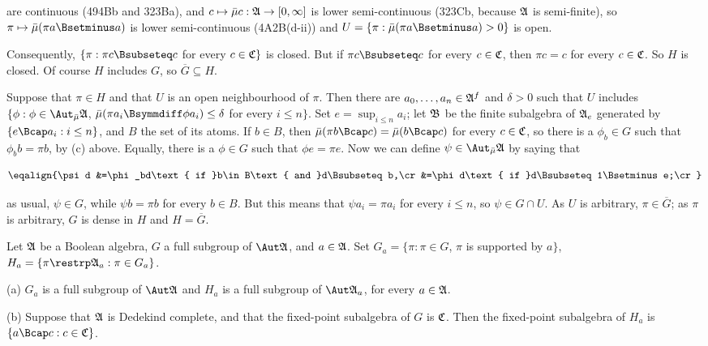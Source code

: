 {\noindent are continuous (494Bb and 323Ba), and
$c\mapsto\bar\mu c:\frak A\to[0,\infty]$ is lower semi-continuous
(323Cb, because $\frak A$ is semi-finite), so
$\pi\mapsto\bar\mu(\pi a\Bsetminus a)$ is lower semi-continuous
(4A2B(d-ii)) and $U=\{\pi:\bar\mu(\pi a\Bsetminus a)>0\}$ is open.\ \Qed

Consequently, $\{\pi:\pi c\Bsubseteq c$ for every $c\in\frak C\}$ is
closed.   But if $\pi c\Bsubseteq c$ for every $c\in\frak C$, then
$\pi c=c$ for every $c\in\frak C$.  So $H$ is closed.   Of course
$H$ includes $G$, so $\overline{G}\subseteq H$.

\medskip

Suppose that $\pi\in H$ and that $U$ is an open neighbourhood of $\pi$.
Then there are $a_0,\ldots,a_n\in\frak A^f$ and
$\delta>0$ such that $U$ includes
$\{\phi:\phi\in\AmuA$, $\bar\mu(\pi a_i\Bsymmdiff\phi a_i)\le\delta$
for every $i\le n\}$.
Set $e=\sup_{i\le n}a_i$;
let $\frak B$ be the finite subalgebra of $\frak A_e$
generated by
$\{e\Bcap a_i:i\le n\}$, and $B$ the set of its
atoms.
If $b\in B$, then
$\bar\mu(\pi b\Bcap c)=\bar\mu(b\Bcap c)$
for every $c\in\frak C$, so there is a $\phi_b\in G$ such that
$\phi_bb=\pi b$, by (c) above.
Equally, there is a $\phi\in G$ such that $\phi e=\pi e$.   Now we can
define $\psi\in\AmuA$ by saying that

$$\eqalign{\psi d
&=\phi_bd\text{ if }b\in B\text{ and }d\Bsubseteq b,\cr
&=\phi d\text{ if }d\Bsubseteq 1\Bsetminus e;\cr}$$

\noindent as usual, $\psi\in G$, while $\psi b=\pi b$ for every $b\in B$.
But this means that $\psi a_i=\pi a_i$ for every $i\le n$, so
$\psi\in G\cap U$.   As $U$ is arbitrary, $\pi\in\overline{G}$;
as $\pi$ is arbitrary, $G$ is dense in $H$ and $H=\overline{G}$.
}%

 Let $\frak A$ be a Boolean algebra, $G$ a
full subgroup of $\Aut\frak A$, and $a\in\frak A$.   Set
$G_a=\{\pi:\pi\in G$, $\pi$ is supported by $a\}$,
$H_a=\{\pi\restrp\frak A_a:\pi\in G_a\}$.

(a) $G_a$ is a full subgroup of $\Aut\frak A$ and
$H_a$ is a full subgroup of $\Aut\frak A_a$, for every $a\in\frak A$.

(b) Suppose that $\frak A$ is Dedekind complete, and that the fixed-point
subalgebra of $G$ is $\frak C$.
Then the fixed-point subalgebra of $H_a$ is $\{a\Bcap c:c\in\frak C\}$.

